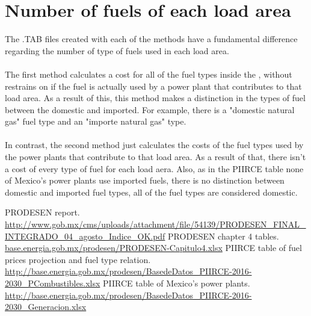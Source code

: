 \documentclass{article}
\begin{document}
\section{Number of fuels of each load area}
The .TAB files created with each of the methods have a fundamental difference regarding the number of type of fuels used in each load area.
\\
\\The first method calculates a cost for all of the fuel types inside the , without restrains on if the fuel is actually used by a power plant that contributes to that load area. As a result of this, this method makes a distinction in the types of fuel between the domestic and imported. For example, there is a "domestic natural gas" fuel type and an "importe natural gas" type.
\\
\\In contrast, the second method just calculates the costs of the fuel types used by the power plants that contribute to that load area. As a result of that, there isn't a cost of every type of fuel for each load aera. Also, as in the PIIRCE table none of Mexico's power plants use imported fuels, there is no distinction between domestic and imported fuel types, all of the fuel types are considered domestic.
\begin{thebibliography}{9}
PRODESEN report. \url{http://www.gob.mx/cms/uploads/attachment/file/54139/PRODESEN_FINAL_INTEGRADO_04_agosto_Indice_OK.pdf}
PRODESEN chapter 4 tables. \url{base.energia.gob.mx/prodesen/PRODESEN-Capitulo4.xlsx}
PIIRCE table of fuel prices projection and fuel type relation. \url{http://base.energia.gob.mx/prodesen/BasedeDatos_PIIRCE-2016-2030_PCombustibles.xlsx}
PIIRCE table of Mexico's power plants. \url{http://base.energia.gob.mx/prodesen/BasedeDatos_PIIRCE-2016-2030_Generacion.xlsx}
\end{thebibliography}
\end{document}
